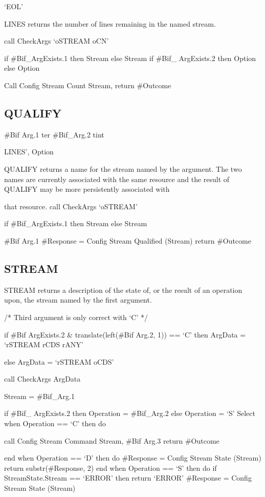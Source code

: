 `EOL'

LINES returns the number of lines remaining in the named stream.

call CheckArgs `oSTREAM oCN'

if \#Bif\_ArgExists.1 then Stream else Stream if \#Bif\_ ArgExists.2
then Option else Option

Call Config Stream Count Stream, return \#Outcome

\hypertarget{qualify}{%
\subsection{QUALIFY}\label{qualify}}

\#Bif Arg.1 ter \#Bif\_Arg.2 tint

LINES', Option

QUALIFY returns a name for the stream named by the argument. The two
names are currently associated with the same resource and the result of
QUALIFY may be more persistently associated with

that resource. call CheckArgs `oSTREAM'

if \#Bif\_ArgExists.1 then Stream else Stream

\#Bif Arg.1 \#Response = Config Stream Qualified (Stream) return
\#Outcome

\hypertarget{stream}{%
\subsection{STREAM}\label{stream}}

STREAM returns a description of the state of, or the result of an
operation upon, the stream named by the first argument.

/* Third argument is only correct with `C' */

if \#Bif ArgExists.2 \& translate(left(\#Bif Arg.2, 1)) == `C' then
ArgData = `rSTREAM rCDS rANY'

else ArgData = `rSTREAM oCDS'

call CheckArgs ArgData

Stream = \#Bif\_Arg.1

if \#Bif\_ ArgExists.2 then Operation = \#Bif\_Arg.2 else Operation =
`S' Select when Operation == `C' then do

call Config Stream Command Stream, \#Bif Arg.3 return \#Outcome

end when Operation == `D' then do \#Response = Config Stream State
(Stream) return substr(\#Response, 2) end when Operation == `S' then do
if StreamState.Stream == `ERROR' then return `ERROR' \#Response = Config
Stream State (Stream)

